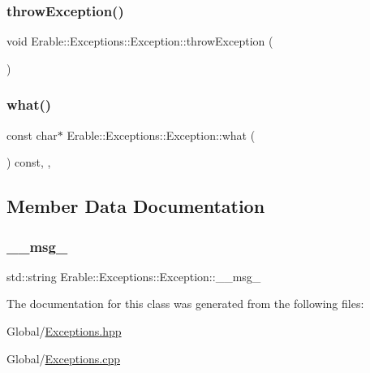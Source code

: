 \subsubsection{\texorpdfstring{throwException()}{throwException()}}
{\footnotesize\ttfamily void Erable\+::\+Exceptions\+::\+Exception\+::throw\+Exception (\begin{DoxyParamCaption}{ }\end{DoxyParamCaption})}

\mbox{\label{class_erable_1_1_exceptions_1_1_exception_a518bc32efd98b49272ade5d2b5aee8cd}} 
\subsubsection{\texorpdfstring{what()}{what()}}
{\footnotesize\ttfamily const char$\ast$ Erable\+::\+Exceptions\+::\+Exception\+::what (\begin{DoxyParamCaption}{ }\end{DoxyParamCaption}) const\hspace{0.3cm}{\ttfamily [inline]}, {\ttfamily [override]}, {\ttfamily [noexcept]}}



\subsection{Member Data Documentation}
\mbox{\label{class_erable_1_1_exceptions_1_1_exception_a660f187522179967a29ff896e61b2165}} 
\subsubsection{\texorpdfstring{\_\_msg\_}{\_\_msg\_}}
{\footnotesize\ttfamily std\+::string Erable\+::\+Exceptions\+::\+Exception\+::\+\_\+\+\_\+msg\+\_\+\hspace{0.3cm}{\ttfamily [private]}}



The documentation for this class was generated from the following files\+:\begin{DoxyCompactItemize}
\item 
Global/\mbox{\hyperlink{_exceptions_8hpp}{Exceptions.\+hpp}}\item 
Global/\mbox{\hyperlink{_exceptions_8cpp}{Exceptions.\+cpp}}\end{DoxyCompactItemize}
